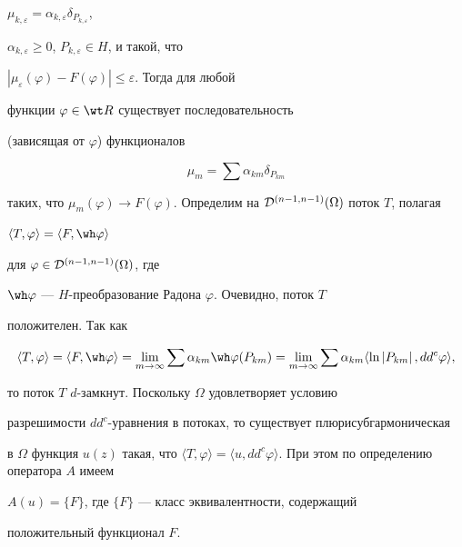 \begin{pf}
$\mu_{k,\varepsilon}= \alpha_{k,\varepsilon}\delta_{P_{k,\varepsilon}}$,


$\alpha_{k,\varepsilon}\ge 0$, $P_{k,\varepsilon}\in H$, и такой, что 


$|\mu_{\varepsilon}(\varphi)-F(\varphi)|\le \varepsilon$. Тогда для любой 


функции $\varphi\in\wt R$ существует последовательность


(зависящая от $\varphi$) функционалов 


$$


\mu_m=\sum\alpha_{km}\delta_{P_{km}}


$$


таких, что $\mu_m(\varphi)\to F(\varphi)$. Определим на ${\cal 


D}^{(n-1,n-1)}(\Omega)$ поток $T$, полагая


$\langle T, \varphi\rangle=\langle F, 


\wh\varphi\rangle$ 


для $\varphi\in{\cal D}^{(n-1,n-1)}(\Omega)$, где


$\wh\varphi$ --- $H$-преобразование Радона $\varphi$. Очевидно, поток $T$ 


положителен. Так как


$$


\langle T,\varphi\rangle=\langle F,\wh\varphi\rangle=


\lim\limits_{m\to\infty}\sum\alpha_{km}\wh\varphi(P_{km})=


\lim\limits_{m\to\infty}\sum\alpha_{km}\langle\ln\left|P_{km}\right|,


dd^c\varphi\rangle,


$$


то поток $T$ $d$-замкнут. Поскольку $\Omega$ удовлетворяет условию 


разрешимости $dd^c$-уравнения в потоках, то существует плюрисубгармоническая 


в $\Omega$ функция $u(z)$ такая, что $\langle T,\varphi\rangle=\langle u, 


dd^c\varphi\rangle$. При этом по определению оператора $A$ имеем 


$A(u)=\{F\}$, где $\{F\}$ --- класс эквивалентности, содержащий 


положительный функционал $F$.


\end{pf}






